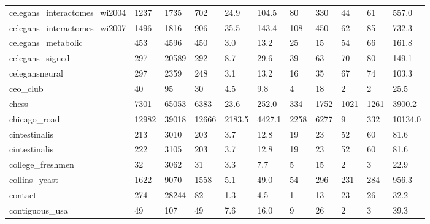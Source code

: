 \begin{longtable}{lllllllllll}
 celegans\_interactomes\_wi2004                       & 1237       & 1735      & 702   & 24.9   & 104.5  & 80    & 330    & 44     & 61     & 557.0   \\
 celegans\_interactomes\_wi2007                       & 1496       & 1816      & 906   & 35.5   & 143.4  & 108   & 450    & 62     & 85     & 732.3   \\
 celegans\_metabolic                                 & 453        & 4596      & 450   & 3.0    & 13.2   & 25    & 15     & 54     & 66     & 161.8   \\
 celegans\_signed                                    & 297        & 20589     & 292   & 8.7    & 29.6   & 39    & 63     & 70     & 80     & 149.1   \\
 celegansneural                                     & 297        & 2359      & 248   & 3.1    & 13.2   & 16    & 35     & 67     & 74     & 103.3   \\
 ceo\_club                                           & 40         & 95        & 30    & 4.5    & 9.8    & 4     & 18     & 2      & 2      & 25.5    \\
 chess                                              & 7301       & 65053     & 6383  & 23.6   & 252.0  & 334   & 1752   & 1021   & 1261   & 3900.2  \\
 chicago\_road                                       & 12982      & 39018     & 12666 & 2183.5 & 4427.1 & 2258  & 6277   & 9      & 332    & 10134.0 \\
 cintestinalis                                      & 213        & 3010      & 203   & 3.7    & 12.8   & 19    & 23     & 52     & 60     & 81.6    \\
 cintestinalis                                      & 222        & 3105      & 203   & 3.7    & 12.8   & 19    & 23     & 52     & 60     & 81.6    \\
 college\_freshmen                                   & 32         & 3062      & 31    & 3.3    & 7.7    & 5     & 15     & 2      & 3      & 22.9    \\
 collins\_yeast                                      & 1622       & 9070      & 1558  & 5.1    & 49.0   & 54    & 296    & 231    & 284    & 956.3   \\
 contact                                            & 274        & 28244     & 82    & 1.3    & 4.5    & 1     & 13     & 23     & 26     & 32.2    \\
 contiguous\_usa                                     & 49         & 107       & 49    & 7.6    & 16.0   & 9     & 26     & 2      & 3      & 39.3    \\

\end{longtable}

